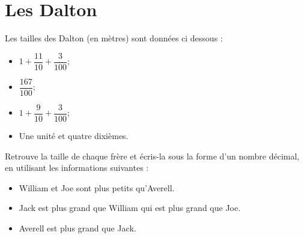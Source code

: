 \section{Les Dalton}

Les tailles des Dalton (en mètres) sont données ci dessous :

\begin{itemize}
	\item $1 + \dfrac{11}{10} + \dfrac{3}{100}$;
	\item $\dfrac{167}{100}$;
	\item $1 + \dfrac{9}{10} + \dfrac{3}{100}$;
	\item Une unité et quatre dixièmes.
\end{itemize}

\begin{questions}
	Retrouve la taille de chaque frère et écris-la sous la forme d'un nombre décimal, en utilisant les informations suivantes :
	
	\begin{itemize}
		\item William et Joe sont plus petits qu'Averell.
		\item Jack est plus grand que William qui est plus grand que Joe.
		\item Averell est plus grand que Jack.
	\end{itemize}
\end{questions}